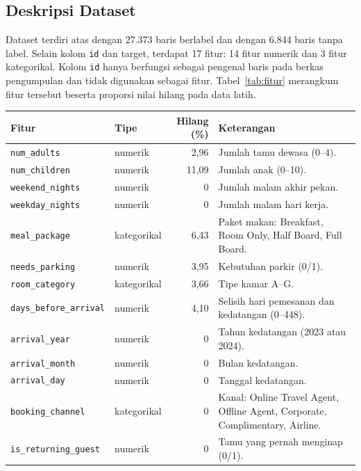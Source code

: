 \subsection{Deskripsi Dataset}
Dataset terdiri atas  dengan 27.373 baris berlabel dan  dengan 6.844 baris tanpa label. Selain kolom \texttt{id} dan target, terdapat 17 fitur: 14 fitur numerik dan 3 fitur kategorikal. Kolom \texttt{id} hanya berfungsi sebagai pengenal baris pada berkas pengumpulan dan tidak digunakan sebagai fitur. Tabel~\ref{tab:fitur} merangkum fitur tersebut beserta proporsi nilai hilang pada data latih.

\begin{table}[htbp]
    \centering
    \small
    \renewcommand{\arraystretch}{1.08}
    \begin{tabularx}{\textwidth}{@{}l l r X@{}}
        \toprule
        Fitur & Tipe & Hilang (\%) & Keterangan \\
        \midrule
        \texttt{num\_adults} & numerik & 2,96 & Jumlah tamu dewasa (0--4). \\
        \texttt{num\_children} & numerik & 11,09 & Jumlah anak (0--10). \\
        \texttt{weekend\_nights} & numerik & 0 & Jumlah malam akhir pekan. \\
        \texttt{weekday\_nights} & numerik & 0 & Jumlah malam hari kerja. \\
        \texttt{meal\_package} & kategorikal & 6,43 & Paket makan: Breakfast, Room Only, Half Board, Full Board. \\
        \texttt{needs\_parking} & numerik & 3,95 & Kebutuhan parkir (0/1). \\
        \texttt{room\_category} & kategorikal & 3,66 & Tipe kamar A--G. \\
        \texttt{days\_before\_arrival} & numerik & 4,10 & Selisih hari pemesanan dan kedatangan (0--448). \\
        \texttt{arrival\_year} & numerik & 0 & Tahun kedatangan (2023 atau 2024). \\
        \texttt{arrival\_month} & numerik & 0 & Bulan kedatangan. \\
        \texttt{arrival\_day} & numerik & 0 & Tanggal kedatangan. \\
        \texttt{booking\_channel} & kategorikal & 0 & Kanal: Online Travel Agent, Offline Agent, Corporate, Complimentary, Airline. \\
        \texttt{is\_returning\_guest} & numerik & 0 & Tamu yang pernah menginap (0/1). \\

\end{tabularx}
\end{table}
